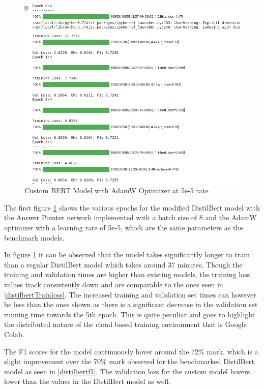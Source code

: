 \documentclass[a4paper,12pt]{report}
\begin{document}
	\begin{figure}[!h]
		\centering
		\includegraphics[scale=0.35]{../images/AdamW5e.png}
		\caption{Custom BERT Model with AdamW Optimizer at 5e-5 rate}\label{adam5e}
	\end{figure}

	The first figure \ref{adam5e} shows the various epochs for the modified DistilBert model with the Answer Pointer network implemented with a batch size of 8 and the AdamW optimizer with a learning rate of 5e-5, which  are the same parameters as the benchmark models.

	In figure \ref{adam5e} it can be observed that the model takes significantly longer to train than a regular DistilBert model which takes around 37 minutes. Though the training and validation times are higher than existing models, the training loss values track consistently down and are comparable to the ones seen in \ref{distilbertTrainloss}. The increased training and validation set times can however be less than the ones shown as there is a significant decrease in the validation set running time towards the 5th epoch. This is quite peculiar and goes to highlight the distributed nature of the cloud based training environment that is Google Colab.

	The F1 scores for the model continuously hover around the 72\% mark, which is a slight improvement over the 70\% mark observed for the benchmarked DistilBert model as seen in \ref{distilbertf1}.
	The validation loss for the custom model hovers lower than the values in the DistilBert model as well.
\end{document}
